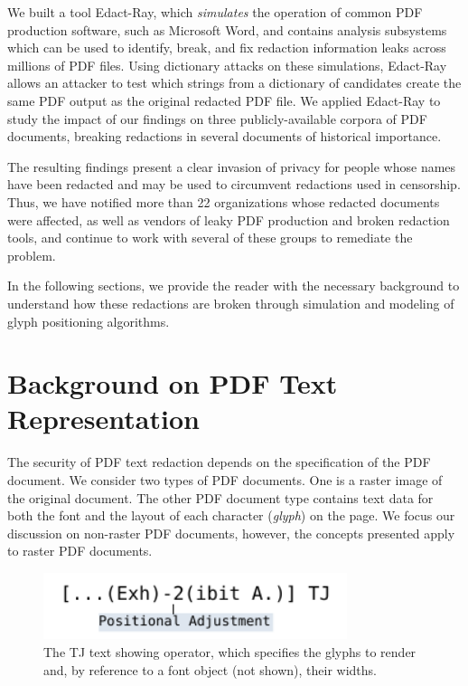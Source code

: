 We built a tool Edact-Ray, which \emph{simulates} the operation of common PDF production software, such as Microsoft Word, and contains analysis subsystems which can be used to identify, break, and fix redaction information leaks across millions of PDF files.
Using dictionary attacks on these simulations, Edact-Ray allows an attacker to test which strings from a dictionary of candidates create the same PDF output as the original redacted PDF file.
We applied Edact-Ray to study the impact of our findings on three publicly-available corpora of PDF documents, breaking redactions in several documents of historical importance.

The resulting findings present a clear invasion of privacy for people whose names have been redacted and may be used to circumvent redactions used in censorship.
Thus, we have notified more than 22 organizations whose redacted documents were affected, as well as vendors of leaky PDF production and broken redaction tools, and continue to work with several of these groups to remediate the problem.

In the following sections, we provide the reader with the necessary background to understand how these redactions are broken through simulation and modeling of glyph positioning algorithms.

\section{Background on PDF Text Representation}

The security of PDF text redaction depends on the specification of the PDF document.
We consider two types of PDF documents.
One is a raster image of the original document.
The other PDF document type contains text data for both the font and the layout of each character (\emph{glyph}) on the page.
We focus our discussion on non-raster PDF documents, however, the concepts presented apply to raster PDF documents.

\begin{figure}[h!]
\centering
\includegraphics[width=3.50in]{tj.pdf}
    \caption{The TJ text showing operator, which specifies the glyphs to render and, by reference to a font object (not shown), their widths.}\label{fig:tj}
\end{figure}

